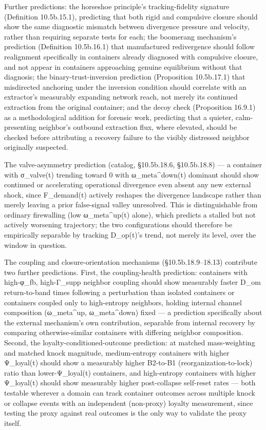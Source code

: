 \documentclass[
]{article}
\begin{document}
Further predictions: the horseshoe principle's tracking-fidelity
signature (Definition 10.5b.15.1), predicting that both rigid and
compulsive closure should show the same diagnostic mismatch between
divergence pressure and velocity, rather than requiring separate tests
for each; the boomerang mechanism's prediction (Definition 10.5b.16.1)
that manufactured redivergence should follow realignment specifically in
containers already diagnosed with compulsive closure, and not appear in
containers approaching genuine equilibrium without that diagnosis; the
binary-trust-inversion prediction (Proposition 10.5b.17.1) that
misdirected anchoring under the inversion condition should correlate
with an extractor's measurably expanding network reach, not merely its
continued extraction from the original container; and the decoy check
(Proposition 16.9.1) as a methodological addition for forensic work,
predicting that a quieter, calm-presenting neighbor's outbound
extraction flux, where elevated, should be checked before attributing a
recovery failure to the visibly distressed neighbor originally
suspected.

The valve-asymmetry prediction (catalog, §10.5b.18.6, §10.5b.18.8) --- a
container with σ\_valve(t) trending toward 0 with ω\_meta\^{}down(t)
dominant should show continued or accelerating operational divergence
even absent any new external shock, since F\_demand(t) actively reshapes
the divergence landscape rather than merely leaving a prior false-signal
valley unresolved. This is distinguishable from ordinary firewalling
(low ω\_meta\^{}up(t) alone), which predicts a stalled but not actively
worsening trajectory; the two configurations should therefore be
empirically separable by tracking D\_op(t)'s trend, not merely its
level, over the window in question.

The coupling and closure-orientation mechanisms (§10.5b.18.9--18.13)
contribute two further predictions. First, the coupling-health
prediction: containers with high-φ\_fb, high-Γ\_supp neighbor coupling
should show measurably faster D\_om return-to-band times following a
perturbation than isolated containers or containers coupled only to
high-entropy neighbors, holding internal channel composition
(ω\_meta\^{}up, ω\_meta\^{}down) fixed --- a prediction specifically
about the external mechanism's own contribution, separable from internal
recovery by comparing otherwise-similar containers with differing
neighbor composition. Second, the loyalty-conditioned-outcome
prediction: at matched mass-weighting and matched knock magnitude,
medium-entropy containers with higher Ψ\_loyal(t) should show a
measurably higher B2-to-B1 (reorganization-to-lock) ratio than
lower-Ψ\_loyal(t) containers, and high-entropy containers with higher
Ψ\_loyal(t) should show measurably higher post-collapse self-reset rates
--- both testable wherever a domain can track container outcomes across
multiple knock or collapse events with an independent (non-proxy)
loyalty measurement, since testing the proxy against real outcomes is
the only way to validate the proxy itself.
\end{document}
